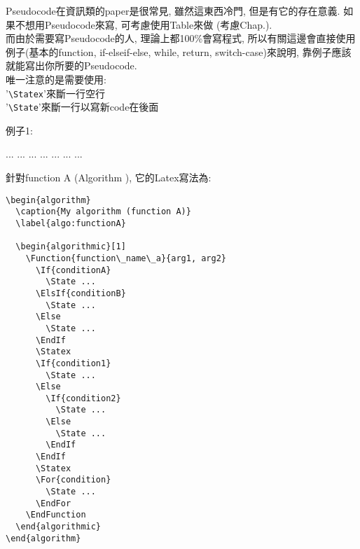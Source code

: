 
Pseudocode在資訊類的paper是很常見, 雖然這東西冷門, 但是有它的存在意義.
如果不想用Pseudocode來寫, 可考慮使用Table來做 (考慮Chap.).\\

而由於需要寫Pseudocode的人, 理論上都100\%會寫程式, 所以有關這邊會直接使用例子(基本的function, if-elseif-else, while, return, switch-case)來說明, 靠例子應該就能寫出你所要的Pseudocode.\\

唯一注意的是需要使用:\\
'\verb|\Statex|'來斷一行空行\\
'\verb|\State|'來斷一行以寫新code在後面


\newpage
例子1:
\begin{algorithm}
  \caption{My algorithm (function A)}
  \label{algo:functionA}

  \begin{algorithmic}[1]
        \State ...
        \State ...
      \Else
        \State ...
      \EndIf
      \Statex
        \State ...
      \Else
          \State ...
        \Else
          \State ...
        \EndIf
      \EndIf
      \Statex
        \State ...
      \EndFor
    \EndFunction
  \end{algorithmic}
\end{algorithm}

\newpage
針對function A (Algorithm ), 它的Latex寫法為:
\EmptyLine
\begin{fmpage}{\textwidth}
  \begin{verbatim}
\begin{algorithm}
  \caption{My algorithm (function A)}
  \label{algo:functionA}

  \begin{algorithmic}[1]
    \Function{function\_name\_a}{arg1, arg2}
      \If{conditionA}
        \State ...
      \ElsIf{conditionB}
        \State ...
      \Else
        \State ...
      \EndIf
      \Statex
      \If{condition1}
        \State ...
      \Else
        \If{condition2}
          \State ...
        \Else
          \State ...
        \EndIf
      \EndIf
      \Statex
      \For{condition}
        \State ...
      \EndFor
    \EndFunction
  \end{algorithmic}
\end{algorithm}
  \end{verbatim}
\end{fmpage}


